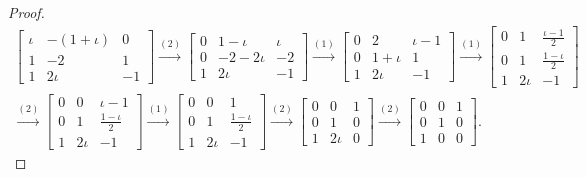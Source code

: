 \begin{proof}
    \begingroup{}
    \allowdisplaybreaks{}
    \begin{align*}
        \begin{bmatrix}
            \iota & -(1 + \iota) & 0  \\
            1     & -2           & 1  \\
            1     & 2\iota       & -1
        \end{bmatrix}
        \stackrel{(2)}{\rightarrow}
        \begin{bmatrix}
            0 & 1 - \iota   & \iota \\
            0 & -2 - 2\iota & -2    \\
            1 & 2\iota      & -1
        \end{bmatrix}
        \stackrel{(1)}{\rightarrow}
        \begin{bmatrix}
            0 & 2         & \iota - 1 \\
            0 & 1 + \iota & 1         \\
            1 & 2\iota    & -1
        \end{bmatrix}
        \stackrel{(1)}{\rightarrow}
        \begin{bmatrix}
            0 & 1      & \frac{\iota - 1}{2} \\
            0 & 1      & \frac{1 - \iota}{2} \\
            1 & 2\iota & -1
        \end{bmatrix} \\
        \stackrel{(2)}{\rightarrow}
        \begin{bmatrix}
            0 & 0      & \iota - 1           \\
            0 & 1      & \frac{1 - \iota}{2} \\
            1 & 2\iota & -1
        \end{bmatrix}
        \stackrel{(1)}{\rightarrow}
        \begin{bmatrix}
            0 & 0      & 1                   \\
            0 & 1      & \frac{1 - \iota}{2} \\
            1 & 2\iota & -1
        \end{bmatrix}
        \stackrel{(2)}{\rightarrow}
        \begin{bmatrix}
            0 & 0      & 1 \\
            0 & 1      & 0 \\
            1 & 2\iota & 0
        \end{bmatrix}
        \stackrel{(2)}{\rightarrow}
        \begin{bmatrix}
            0 & 0 & 1 \\
            0 & 1 & 0 \\
            1 & 0 & 0
        \end{bmatrix}.
    \end{align*}
    \endgroup{}
\end{proof}

